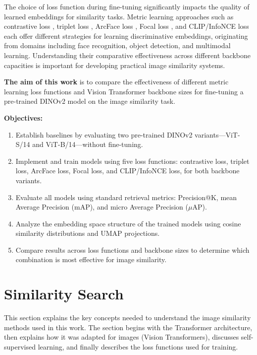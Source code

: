 \documentclass[
    english,
]{VUMIFPSbakalaurinis}
\begin{document}
The choice of loss function during fine-tuning significantly impacts the quality of learned embeddings for similarity tasks. Metric learning approaches such as contrastive loss \cite{Che20}, triplet loss \cite{Sch15}, ArcFace loss \cite{Den22}, Focal loss \cite{Lin17}, and CLIP/InfoNCE loss \cite{Oor18} each offer different strategies for learning discriminative embeddings, originating from domains including face recognition, object detection, and multimodal learning. Understanding their comparative effectiveness across different backbone capacities is important for developing practical image similarity systems.

\textbf{The aim of this work} is to compare the effectiveness of different metric learning loss functions and Vision Transformer backbone sizes for fine-tuning a pre-trained DINOv2 model on the image similarity task.

\textbf{Objectives:}
\begin{enumerate}
    \item Establish baselines by evaluating two pre-trained DINOv2 variants---ViT-S/14 and ViT-B/14---without fine-tuning.
    \item Implement and train models using five loss functions: contrastive loss, triplet loss, ArcFace loss, Focal loss, and CLIP/InfoNCE loss, for both backbone variants.
    \item Evaluate all models using standard retrieval metrics: Precision@K, mean Average Precision (mAP), and micro Average Precision ($\mu$AP).
    \item Analyze the embedding space structure of the trained models using cosine similarity distributions and UMAP projections.
    \item Compare results across loss functions and backbone sizes to determine which combination is most effective for image similarity.
\end{enumerate}

\section{Similarity Search}
\label{sec:similarity_search}

This section explains the key concepts needed to understand the image similarity methods used in this work. The section begins with the Transformer architecture, then explains how it was adapted for images (Vision Transformers), discusses self-supervised learning, and finally describes the loss functions used for training.
\end{document}
